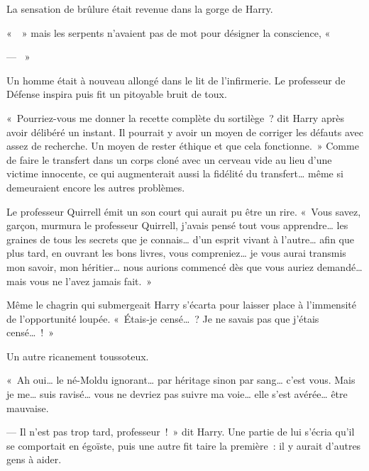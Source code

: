 La sensation de brûlure était revenue dans la gorge de Harry.

«~~» mais les serpents n'avaient pas de mot pour désigner la conscience, «~

--- ~»

Un homme était à nouveau allongé dans le lit de l'infirmerie. Le professeur de Défense inspira puis fit un pitoyable bruit de toux.

«~Pourriez-vous me donner la recette complète du sortilège~? dit Harry après avoir délibéré un instant. Il pourrait y avoir un moyen de corriger les défauts avec assez de recherche. Un moyen de rester éthique et que cela fonctionne.~» Comme de faire le transfert dans un corps cloné avec un cerveau vide au lieu d'une victime innocente, ce qui augmenterait aussi la fidélité du transfert… même si demeuraient encore les autres problèmes.

Le professeur Quirrell émit un son court qui aurait pu être un rire. «~Vous savez, garçon, murmura le professeur Quirrell, j'avais pensé tout vous apprendre… les graines de tous les secrets que je connais… d'un esprit vivant à l'autre… afin que plus tard, en ouvrant les bons livres, vous compreniez… je vous aurai transmis mon savoir, mon héritier… nous aurions commencé dès que vous auriez demandé… mais vous ne l'avez jamais fait.~»

Même le chagrin qui submergeait Harry s'écarta pour laisser place à l'immensité de l'opportunité loupée. «~Étais-je censé…~? Je ne savais pas que j'étais censé…~!~»

Un autre ricanement toussoteux.

«~Ah oui… le né-Moldu ignorant… par héritage sinon par sang… c'est vous. Mais je me… suis ravisé… vous ne devriez pas suivre ma voie… elle s'est avérée… être mauvaise.

--- Il n'est pas trop tard, professeur~!~» dit Harry. Une partie de lui s'écria qu'il se comportait en égoïste, puis une autre fit taire la première~: il y aurait d'autres gens à aider.

